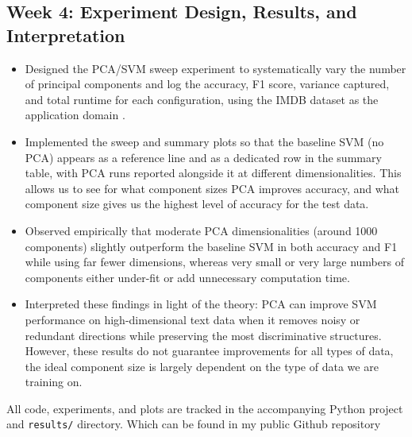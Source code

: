\documentclass[runningheads]{llncs}
\begin{document}
\subsection*{Week 4: Experiment Design, Results, and Interpretation}
\begin{itemize}
  \item Designed the PCA/SVM sweep experiment to systematically vary the number of principal components and log the accuracy, F1 score, variance captured, and total runtime for each configuration, using the IMDB dataset as the application domain \cite{maas2011imdb}.
  \item Implemented the sweep and summary plots so that the baseline SVM (no PCA) appears as a reference line and as a dedicated row in the summary table, with PCA runs reported alongside it at different dimensionalities. This allows us to see for what component sizes PCA improves accuracy, and what component size gives us the highest level of accuracy for the test data.
  \item Observed empirically that moderate PCA dimensionalities (around 1000 components) slightly outperform the baseline SVM in both accuracy and F1 while using far fewer dimensions, whereas very small or very large numbers of components either under-fit or add unnecessary computation time.
  \item Interpreted these findings in light of the theory: PCA can improve SVM performance on high-dimensional text data when it removes noisy or redundant directions while preserving the most discriminative structures. However, these results do not guarantee improvements for all types of data, the ideal component size is largely dependent on the type of data we are training on.
\end{itemize}

\medskip

\noindent All code, experiments, and plots are tracked in the accompanying Python project and \texttt{results/} directory.  Which can be found in my public Github repository \cite{kaila2026svmsemantic}

\medskip
\newpage


\end{document}
